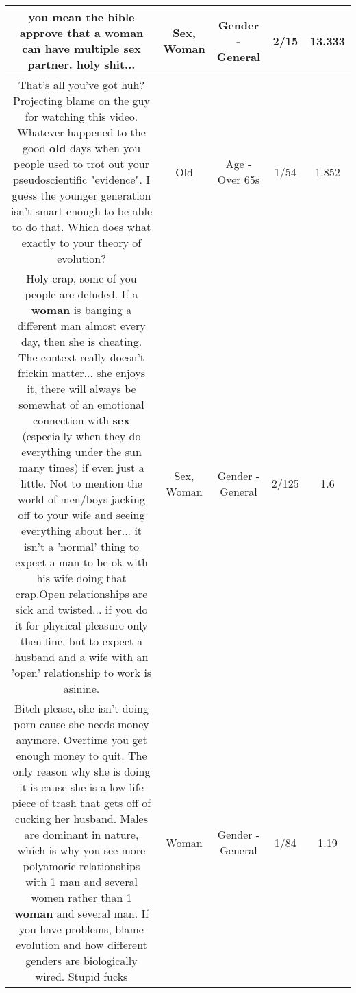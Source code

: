 \documentclass[11pt]{article}
\newlength\mylength
\begin{document}
\begin{center}
\begin{longtable}{|C{.65\mylength}|C{.30\mylength}|C{.12\mylength}|C{.12\mylength}|C{.12\mylength}|}
  \small you mean the bible approve that a \textbf{woman} can have multiple \textbf{sex} partner. holy shit...\normalsize   & Sex, Woman & Gender - General & 2/15 & 13.333 \\  \hline
  \small That's all you've got huh?  Projecting blame on the guy for watching this video.  Whatever happened to the good \textbf{old} days when you people used to trot out your pseudoscientific "evidence".  I guess the younger generation isn't smart enough to be able to do that.  Which does what exactly to your theory of evolution?\normalsize   & Old & Age - Over 65s & 1/54 & 1.852 \\  \hline
  \small Holy crap, some of you people are deluded.  If a \textbf{woman} is banging a different man almost every day, then she is cheating.  The context really doesn't frickin matter... she enjoys it, there will always be somewhat of an emotional connection with \textbf{sex} (especially when they do everything under the sun many times) if even just a little.  Not to mention the world of men/boys jacking off to your wife and seeing everything about her... it isn't a 'normal' thing to expect a man to be ok with his wife doing that crap.Open relationships are sick and twisted... if you do it for physical pleasure only then fine, but to expect a husband and a wife with an 'open' relationship to work is asinine.\normalsize   & Sex, Woman & Gender - General & 2/125 & 1.6 \\  \hline
  \small Bitch please, she isn't doing porn cause she needs money anymore. Overtime you get enough money to quit. The only reason why she is doing it is cause she is a low life piece of trash that gets off of cucking her husband. Males are dominant in nature, which is why you see more polyamoric relationships with 1 man and several women rather than 1 \textbf{woman} and several man. If you have problems, blame evolution and how different genders are biologically wired. Stupid fucks\normalsize   & Woman & Gender - General & 1/84 & 1.19 \\  \hline

\end{longtable}
\end{center}
\end{document}
